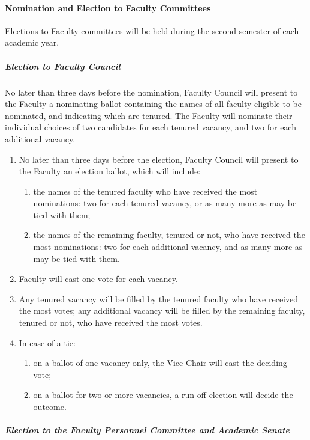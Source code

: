 			\paragraph{	Nomination and Election to Faculty Committees}
				\label{sec:NominationAndElectionToFacultyCommittees}
				Elections to Faculty committees will be held during the second semester of each academic year.
				\subparagraph{Election to Faculty Council}
					No later than three days before the nomination, Faculty Council will present to the Faculty a nominating ballot containing the names of all faculty eligible to be nominated, and indicating which are tenured.  The Faculty will nominate their individual choices of two candidates for each tenured vacancy, and two for each additional vacancy.
					\begin{enumerate}[label=\alph*)]
						\item{No later than three days before the election, Faculty Council will present to the Faculty an election ballot, which will include:
							\begin{enumerate}[label=\arabic*)]
								\item{the names of the tenured faculty who have received the most nominations:  two for each tenured vacancy, or as many more as may be tied with them;}
								\item{the names of the remaining faculty, tenured or not, who have received the most nominations:  two for each additional vacancy, and as many more as may be tied with them.}
							\end{enumerate}
						}
						\item{Faculty will cast one vote for each vacancy.}
						\item{Any tenured vacancy will be filled by the tenured faculty who have received the most votes; any additional vacancy will be filled by the remaining faculty, tenured or not, who have received the most votes.}
						\item{In case of a tie:
							\begin{enumerate}[label=\arabic*)]
								\item{on a ballot of one vacancy only, the Vice-Chair will cast the deciding vote;}
								\item{on a ballot for two or more vacancies, a run-off election will decide the outcome.}
							\end{enumerate}
						}
					\end{enumerate}
				\subparagraph{Election to the Faculty Personnel Committee and Academic Senate}
